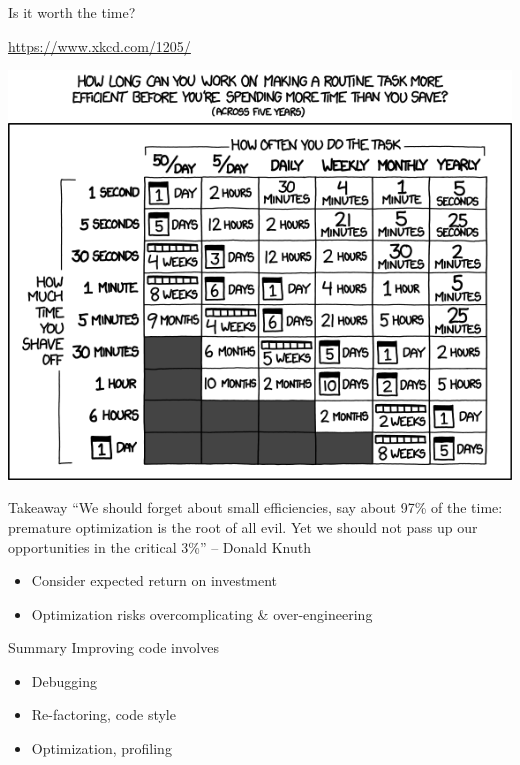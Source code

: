 \documentclass[aspectratio=169,usenames,dvipsnames]{beamer}
\begin{document}
\begin{frame}{Is it worth the time?}
    \begin{reference}
        \url{https://www.xkcd.com/1205/}
    \end{reference}
    \centering\includegraphics[height=0.9\textheight]{fig/xkcdworththetime}
\end{frame}

\begin{frame}{Takeaway}
    ``We should forget about small efficiencies, say about 97\% of the time:
    premature optimization is the root of all evil. Yet we should not pass up
    our opportunities in the critical 3\%'' -- Donald Knuth

    \vspace{1em}
    \begin{itemize}
        \item Consider expected return on investment
        \item Optimization risks overcomplicating \& over-engineering
    \end{itemize}
\end{frame}

\begin{frame}{Summary}
    Improving code involves
    \begin{itemize}
        \item Debugging
        \item Re-factoring, code style
        \item Optimization, profiling
    \end{itemize}
\end{frame}
\end{document}
